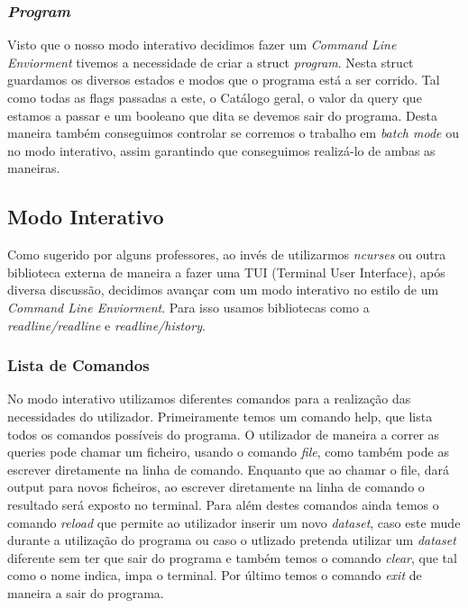 \documentclass{article}
\begin{document}
        \subsubsection{\emph{Program}}
            Visto que o nosso modo interativo decidimos fazer um \emph{Command Line Enviorment} tivemos
            a necessidade de criar a struct \emph{program}. Nesta struct guardamos os diversos estados e
            modos que o programa está a ser corrido. Tal como todas as flags passadas a este, o Catálogo 
            geral, o valor da query que estamos a passar e um booleano que dita se devemos sair do programa.
            Desta maneira também conseguimos controlar se corremos o trabalho em \emph{batch mode} ou no 
            modo interativo, assim garantindo que conseguimos realizá-lo de ambas as maneiras.
    \subsection{Modo Interativo}
            Como sugerido por alguns professores, ao invés de utilizarmos \emph{ncurses} ou outra 
            biblioteca externa de maneira a fazer uma TUI (Terminal User Interface), após diversa 
            discussão, decidimos avançar com um modo interativo no estilo de um \emph{Command Line 
            Enviorment}. Para isso usamos bibliotecas como a \emph{readline/readline} e 
            \emph{readline/history}. 
        \subsubsection{Lista de Comandos}
            No modo interativo utilizamos diferentes comandos para a realização das necessidades do
            utilizador. Primeiramente temos um comando help, que lista todos os comandos possíveis 
            do programa. O utilizador de maneira a correr as queries pode chamar um ficheiro, usando 
            o comando \emph{file}, como também pode as escrever diretamente na linha de comando. Enquanto 
            que ao chamar o file, dará output para novos ficheiros, ao escrever diretamente na linha de 
            comando o resultado será exposto no terminal. Para além destes comandos ainda temos o comando 
            \emph{reload} que permite ao utilizador inserir um novo \emph{dataset}, caso este mude 
            durante a utilização do programa ou caso o utlizado pretenda utilizar um \emph{dataset}
            diferente sem ter que sair do programa e também temos o comando \emph{clear}, que tal como
            o nome indica, impa o terminal. Por último temos o comando \emph{exit} de maneira a sair do 
            programa.
\end{document}
